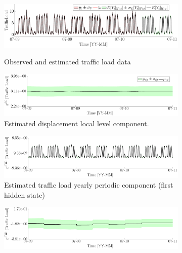 \begin{figure}[h!]
\begin{center}
\begin{subfigure}{\linewidth}\centering
\qquad~\includegraphics[width=0.83\linewidth]{./docfigs/Example_TRAFFIC/optim_param_optim_initialhiddenstate/TrafficLoad_ObservedPredicted.pdf} 
\caption{Observed and estimated traffic load data}
\end{subfigure}
\begin{subfigure}{\linewidth}\centering
\includegraphics[width=0.9\linewidth]{./docfigs/Example_TRAFFIC/optim_param_optim_initialhiddenstate/TrafficLoad_LL_1.pdf}
\caption{Estimated displacement local level component.}
\end{subfigure}
\begin{subfigure}{\linewidth}\centering
\includegraphics[width=0.9\linewidth]{./docfigs/Example_TRAFFIC/optim_param_optim_initialhiddenstate/TrafficLoad_KR0_2.pdf} 
\caption{Estimated traffic load yearly periodic component (first hidden state)}
\end{subfigure}
\begin{subfigure}{\linewidth}\centering
\includegraphics[width=0.9\linewidth]{./docfigs/Example_TRAFFIC/optim_param_optim_initialhiddenstate/TrafficLoad_KR1_3.pdf}

\end{subfigure}
\end{center}
\end{figure}
